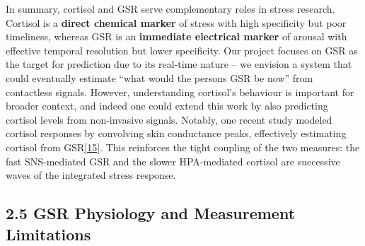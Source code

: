 \documentclass[12pt,a4paper]{article}
\begin{document}
In summary, cortisol and GSR serve complementary roles in stress research. Cortisol is a \textbf{direct chemical marker} of stress with high specificity but poor timeliness, whereas GSR is an \textbf{immediate electrical marker} of arousal with effective temporal resolution but lower specificity. Our project focuses on GSR as the target for prediction due to its real-time nature -- we envision a system that could eventually estimate ``what would the person\textquotesingle s GSR be now'' from contactless signals. However, understanding cortisol's behaviour is important for broader context, and indeed one could extend this work by also predicting cortisol levels from non-invasive signals. Notably, one recent study modeled cortisol responses by convolving skin conductance peaks, effectively estimating cortisol from GSR\href{https://www.frontiersin.org/journals/computer-science/articles/10.3389/fcomp.2020.00039/full\#:~:text=Since\%20psychological\%20stress\%20results\%20in,Poh\%20et}{{[}15{]}}. This reinforces the tight coupling of the two measures: the fast SNS-mediated GSR and the slower HPA-mediated cortisol are successive waves of the integrated stress response.

\subsection{2.5 GSR Physiology and Measurement Limitations}\label{gsr-physiology-and-measurement-limitations}
\end{document}
